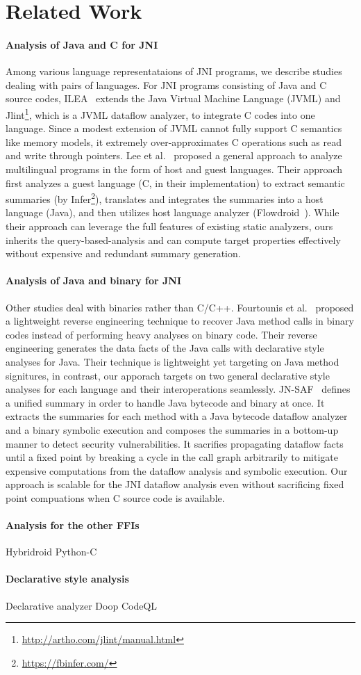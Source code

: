 \section{Related Work}
\paragraph{Analysis of Java and C for JNI}
Among various language representataions of JNI programs, we describe studies
dealing with pairs of languages.
For JNI programs consisting of Java and C source codes, ILEA~\cite{ILEA} extends
the Java Virtual Machine Language (JVML) and Jlint\footnote{\url{http://artho.com/jlint/manual.html}}, which is a JVML dataflow
analyzer, to integrate C codes into one language.  Since a modest extension of
JVML cannot fully support C semantics like memory models, it extremely
over-approximates C operations such as read and write through pointers.
Lee et al.~\cite{LeeASE20} proposed a general approach to analyze multilingual
programs in the form of host and guest languages.  Their approach first analyzes
a guest language (C, in their implementation) to extract semantic summaries
(by Infer\footnote{\url{https://fbinfer.com/}}), translates and integrates the summaries into a host
language (Java), and then utilizes host language analyzer (Flowdroid~\cite{Flowdroid}).
While their approach can leverage the full features of existing static
analyzers, ours inherits the query-based-analysis and can compute target
properties effectively without expensive and redundant summary generation.

\paragraph{Analysis of Java and binary for JNI}
Other studies deal with binaries rather than C/C++.
Fourtounis et al.~\cite{scanning} proposed a lightweight reverse engineering
technique to recover Java method calls in binary codes instead of performing
heavy analyses on binary code.  Their reverse engineering generates the data
facts of the Java calls with declarative style analyses for Java.
Their technique is lightweight yet targeting on Java method signitures,
in contrast, our apporach targets on two general declarative style analyses for
each language and their interoperations seamlessly.
JN-SAF~\cite{JN-SAF} defines a unified summary in order to handle Java bytecode
and binary at once.  It extracts the summaries for each method with a Java
bytecode dataflow analyzer and a binary symbolic execution and composes the
summaries in a bottom-up manner to detect security vulnerabilities.
It sacrifies propagating dataflow facts until a fixed point by breaking a cycle
in the call graph arbitrarily to mitigate expensive computations from the
dataflow analysis and symbolic execution.  Our approach is scalable
for the JNI dataflow analysis even without sacrificing fixed point compuations
when C source code is available.

\paragraph{Analysis for the other FFIs}
Hybridroid
Python-C

\paragraph{Declarative style analysis}
Declarative analyzer
Doop
CodeQL

